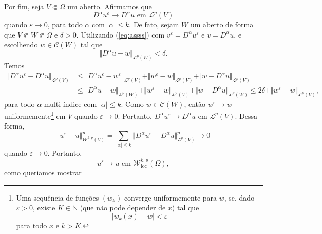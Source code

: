 \documentclass[a4paper, 11pt]{book}
\theoremstyle{definition}
\newcommand{\bN}{\mathbb{N}}
\newcommand{\cC}{\mathcal{C}}
\newcommand{\cL}{\mathcal{L}}
\newcommand{\cW}{\mathcal{W}}
\newcommand{\loc}{\mathrm{loc}}
\begin{document}
\begin{prf}
    Por fim, seja $V \Subset \Omega$ um aberto. Afirmamos que
    \begin{equation}
        D ^\alpha u^\varepsilon \to D^\alpha u \text{ em } \cL^p(V)
    \end{equation}
    quando $\varepsilon \to 0$, para todo $\alpha$ com $|\alpha| \leqslant k$.
    De fato, sejam $W$ um aberto de forma que $V \Subset W \Subset \Omega$ e $\delta > 0$. Utilizando (\ref{eq:assss}) com $v ^\varepsilon = D^\alpha u^\varepsilon$ e $v = D^\alpha u$, e escolhendo $w \in \cC(W)$ tal que
    \[
        \Vert D^\alpha u - w \Vert_{\cL^p(W)} < \delta.
    \]
    Temos
    \[
        \begin{aligned}
            \Vert D^\alpha u^\varepsilon - D^\alpha u \Vert_{\cL^p(V)} 
            &\leqslant \Vert D^\alpha u^\varepsilon - w^\varepsilon \Vert_{\cL^p(V)} + \Vert w^\varepsilon - w \Vert_{\cL^p(V)} + \Vert w - D^\alpha u \Vert_{\cL^p(V)}\\
            &\leqslant \Vert D^\alpha u - w \Vert_{\cL^p(W)} + \Vert w^\varepsilon - w \Vert_{\cL^p(V)} + \Vert w - D^\alpha u \Vert_{\cL^p(W)} \leqslant 2\delta + \Vert w^\varepsilon - w \Vert_{\cL^p(V)},
        \end{aligned}
    \]
    para todo $\alpha$ multi-índice com $|\alpha| \leqslant k$.
    Como $w \in \cC(W)$, então $w^\varepsilon \to w$ uniformemente\footnote{Uma sequência de funções $(w_k)$ converge uniformemente para $w$, se, dado $\varepsilon > 0$, existe $K \in \bN$ (que não pode depender de $x$) tal que
    \[
        | w_k(x) - w | < \varepsilon
    \]
    para todo $x$ e $k > K$.
    } em $V$ quando $\varepsilon \to 0$. 
    Portanto, $D^\alpha u^\varepsilon \to D^\alpha u$ em $\cL^p(V)$.
    Dessa forma,
    \[
        \Vert u^\varepsilon - u \Vert^p_{\cW^{k,p}(V)} = \sum_{|\alpha| \leqslant k} \Vert D^\alpha u^\varepsilon - D^\alpha u \Vert^p_{\cL^p(V)} \to 0 
    \]
    quando $\varepsilon \to 0$. Portanto,
    \[
        u^\varepsilon \to u \text{ em } \cW^{k,p}_\loc(\Omega),
    \]
    como queriamos mostrar
\end{prf}
\end{document}
